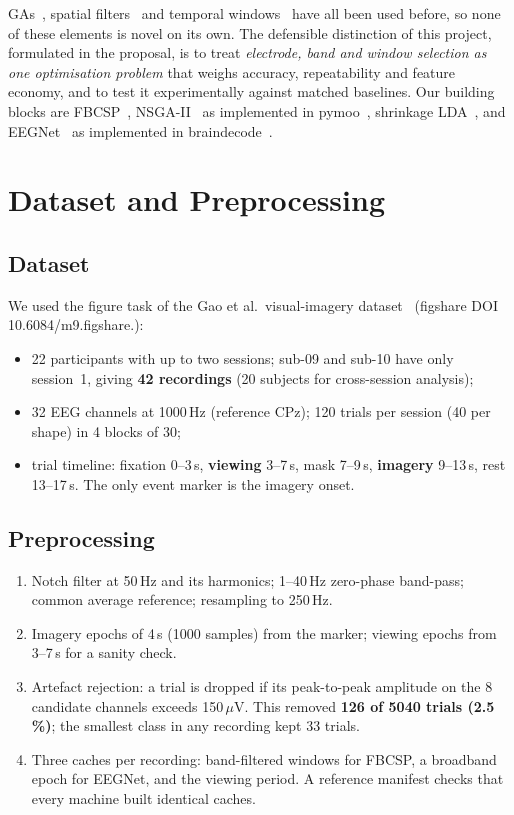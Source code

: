 \documentclass[11pt,a4paper]{article}
\begin{document}
GAs~\cite{llorella2020}, spatial filters~\cite{costa2019,korik2024} and temporal windows~\cite{korik2024}
have all been used before, so none of these elements is novel on its own. The defensible distinction of
this project, formulated in the proposal, is to treat \emph{electrode, band and window selection as one
optimisation problem} that weighs accuracy, repeatability and feature economy, and to test it
experimentally against matched baselines. Our building blocks are FBCSP~\cite{ang2008},
NSGA-II~\cite{deb2002} as implemented in pymoo~\cite{pymoo}, shrinkage LDA~\cite{ledoit2004}, and
EEGNet~\cite{lawhern2018} as implemented in braindecode~\cite{schirrmeister2017}.

\section{Dataset and Preprocessing}

\subsection{Dataset}
We used the figure task of the Gao et al.\ visual-imagery dataset~\cite{gao2026} (figshare DOI
10.6084/\allowbreak m9.\allowbreak figshare.):
\begin{itemize}
  \item 22 participants with up to two sessions; sub-09 and sub-10 have only session~1, giving
        \textbf{42 recordings} (20 subjects for cross-session analysis);
  \item 32 EEG channels at 1000\,Hz (reference CPz); 120 trials per session (40 per shape) in
        4 blocks of 30;
  \item trial timeline: fixation 0--3\,s, \textbf{viewing} 3--7\,s, mask 7--9\,s, \textbf{imagery}
        9--13\,s, rest 13--17\,s. The only event marker is the imagery onset.
\end{itemize}

\subsection{Preprocessing}
\begin{enumerate}
  \item Notch filter at 50\,Hz and its harmonics; 1--40\,Hz zero-phase band-pass; common average
        reference; resampling to 250\,Hz.
  \item Imagery epochs of 4\,s (1000 samples) from the marker; viewing epochs from 3--7\,s for a sanity
        check.
  \item Artefact rejection: a trial is dropped if its peak-to-peak amplitude on the 8 candidate
        channels exceeds 150\,$\mu$V. This removed \textbf{126 of 5040 trials (2.5\,\%)}; the smallest
        class in any recording kept 33 trials.
  \item Three caches per recording: band-filtered windows for FBCSP, a broadband epoch for EEGNet, and
        the viewing period. A reference manifest checks that every machine built identical caches.
\end{enumerate}
\end{document}

